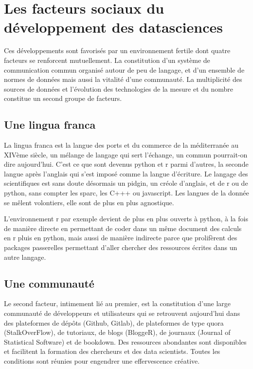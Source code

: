 \documentclass[
]{book}
\begin{document}
\hypertarget{les-facteurs-sociaux-du-duxe9veloppement-des-datasciences}{%
\section{Les facteurs sociaux du développement des datasciences}\label{les-facteurs-sociaux-du-duxe9veloppement-des-datasciences}}

Ces développements sont favorisés par un environnement fertile dont quatre facteurs se renforcent mutuellement. La constitution d'un système de communication commun organisé autour de peu de langage, et d'un ensemble de normes de données mais aussi la vitalité d'une communauté. La multiplicité des sources de données et l'évolution des technologies de la mesure et du nombre constitue un second groupe de facteurs.

\hypertarget{une-lingua-franca}{%
\subsection{Une lingua franca}\label{une-lingua-franca}}

La lingua franca est la langue des ports et du commerce de la méditerranée au XIVème siècle, un mélange de langage qui sert l'échange, un commun pourrait-on dire aujourd'hui. C'est ce que sont devenus python et r parmi d'autres, la seconde langue après l'anglais qui s'est imposé comme la langue d'écriture. Le langage des scientifiques est sans doute désormais un pidgin, un créole d'anglais, et de r ou de python, sans compter les sparc, les C+++ ou javascript. Les langues de la donnée se mêlent volontiers, elle sont de plus en plus agnostique.

L'environnement r par exemple devient de plus en plus ouverts à python, à la fois de manière directe en permettant de coder dans un même document des calculs en r pluis en python, mais aussi de manière indirecte parce que prolifèrent des packages passerelles permettant d'aller chercher des ressources écrites dans un autre langage.

\hypertarget{une-communautuxe9}{%
\subsection{Une communauté}\label{une-communautuxe9}}

Le second facteur, intimement lié au premier, est la constitution d'une large communauté de développeurs et utilisateurs qui se retrouvent aujourd'hui dans des plateformes de dépôts (Github, Gitlab), de plateformes de type quora (StalkOverFlow), de tutoriaux, de blogs (BloggeR), de journaux (Journal of Statistical Software) et de bookdown. Des ressources abondantes sont disponibles et facilitent la formation des chercheurs et des data scientists. Toutes les conditions sont réunies pour engendrer une effervescence créative.
\end{document}

